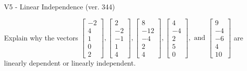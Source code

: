 \begin{exercise}
  \begin{exerciseTitle}V5 - Linear Independence (ver. 344)\end{exerciseTitle}
  \begin{exerciseStatement}
    Explain why the vectors \(\left[\begin{array}{r}
-2 \\
4 \\
1 \\
0 \\
2
\end{array}\right] , \left[\begin{array}{r}
2 \\
-2 \\
-1 \\
1 \\
4
\end{array}\right] , \left[\begin{array}{r}
8 \\
-12 \\
-4 \\
2 \\
4
\end{array}\right] , \left[\begin{array}{r}
4 \\
-4 \\
2 \\
5 \\
0
\end{array}\right] , \text{ and } \left[\begin{array}{r}
9 \\
-4 \\
-6 \\
4 \\
10
\end{array}\right]\) are linearly dependent or linearly independent.	



\end{exerciseStatement}
\end{exercise}
